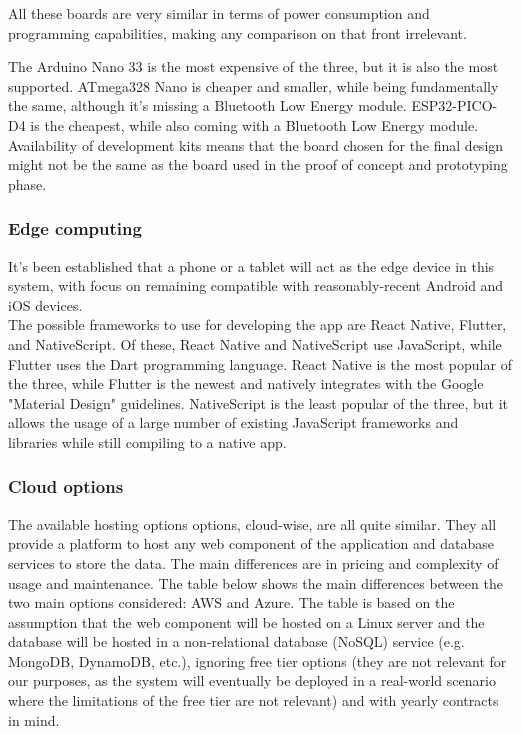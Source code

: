 All these boards are very similar in terms of power consumption and programming
capabilities, making any comparison on that front irrelevant.

The Arduino Nano 33 is the most expensive of the three, but it is also the most
supported. ATmega328 Nano is cheaper and smaller, while being fundamentally the
same, although it's missing a Bluetooth Low Energy module. ESP32-PICO-D4 is the
cheapest, while also coming with a Bluetooth Low Energy module. Availability of
development kits means that the board chosen for the final design might not be the
same as the board used in the proof of concept and prototyping phase. 
\subsubsection{Edge computing}
It's been established that a phone or a tablet will act as the edge device in this
system, with focus on remaining compatible with reasonably-recent Android and iOS
devices. \\
The possible frameworks to use for developing the app are React Native, Flutter,
and NativeScript. Of these, React Native and NativeScript use JavaScript, while
Flutter uses the Dart programming language. React Native is the most popular of
the three, while Flutter is the newest and natively integrates with the Google
"Material Design" guidelines. NativeScript is the least popular of the three, but
it allows the usage of a large number of existing JavaScript frameworks and libraries
while still compiling to a native app. \\

\subsubsection{Cloud options}
The available hosting options options, cloud-wise, are all quite similar. They all
provide a platform to host any web component of the application and database services
to store the data. The main differences are in pricing and complexity of usage and
maintenance. The table below shows the main differences between the two main
options considered: AWS and Azure. The table is based on the assumption
that the web component will be hosted on a Linux server and the database will be
hosted in a non-relational database (NoSQL) service (e.g. MongoDB, DynamoDB, etc.),
ignoring free tier options (they are not relevant for our purposes, as the system will
eventually be deployed in a real-world scenario where the limitations of the free
tier are not relevant) and with yearly contracts in mind.

